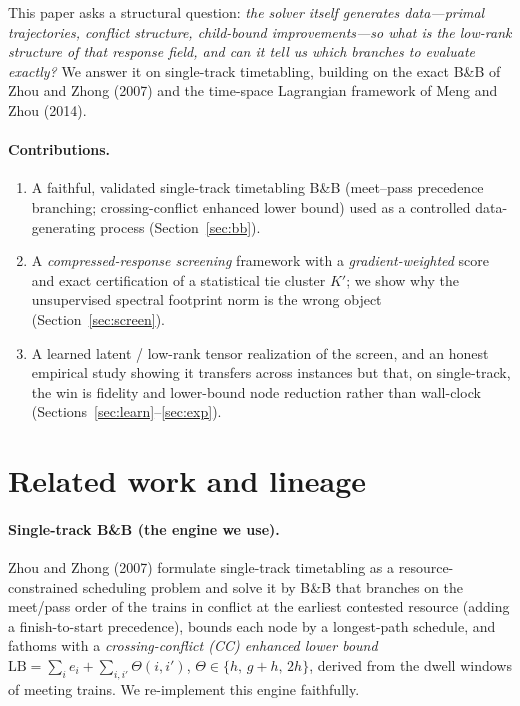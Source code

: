 \documentclass[11pt]{article}
\begin{document}
This paper asks a structural question: \emph{the solver itself generates data---primal
trajectories, conflict structure, child-bound improvements---so what is the low-rank
structure of that response field, and can it tell us which branches to evaluate exactly?}
We answer it on single-track timetabling, building on the exact B\&B of Zhou and Zhong
(2007) and the time-space Lagrangian framework of Meng and Zhou (2014).

\paragraph{Contributions.}
\begin{enumerate}
\item A faithful, validated single-track timetabling B\&B (meet--pass precedence branching;
crossing-conflict enhanced lower bound) used as a controlled data-generating process
(Section~\ref{sec:bb}).
\item A \emph{compressed-response screening} framework with a \emph{gradient-weighted} score
and exact certification of a statistical tie cluster $K'$; we show why the unsupervised
spectral footprint norm is the wrong object (Section~\ref{sec:screen}).
\item A learned latent / low-rank tensor realization of the screen, and an honest empirical
study showing it transfers across instances but that, on single-track, the win is fidelity
and lower-bound node reduction rather than wall-clock (Sections~\ref{sec:learn}--\ref{sec:exp}).
\end{enumerate}

\section{Related work and lineage}
\paragraph{Single-track B\&B (the engine we use).} Zhou and Zhong (2007) formulate
single-track timetabling as a resource-constrained scheduling problem and solve it by B\&B
that branches on the meet/pass order of the trains in conflict at the earliest contested
resource (adding a finish-to-start precedence), bounds each node by a longest-path schedule,
and fathoms with a \emph{crossing-conflict (CC) enhanced lower bound}
$\mathrm{LB}=\sum_i e_i + \sum_{i,i'}\Theta(i,i')$, $\Theta\in\{h,\,g{+}h,\,2h\}$, derived
from the dwell windows of meeting trains. We re-implement this engine faithfully.
\end{document}
